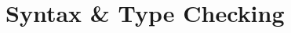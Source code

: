 \documentclass{sig-alternate}
\begin{document}

%

%
%
\newpage
\onecolumn
\appendix
\section{Syntax \& Type Checking}
\end{document}

